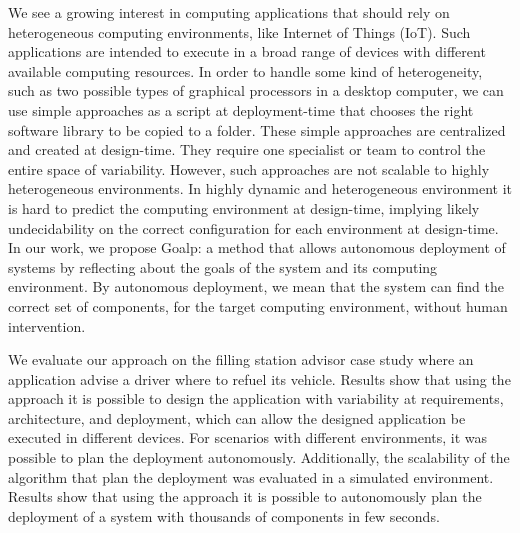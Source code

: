 We see a growing interest in computing applications that should rely on heterogeneous computing environments, like Internet of Things (IoT).
Such applications are intended to execute in a broad range of devices with different available computing resources.
In order to handle some kind of heterogeneity, such as two possible types of graphical processors in a desktop computer, we can use simple approaches as a script at deployment-time that chooses the right software library to be copied to a folder.
These simple approaches are centralized and created at design-time. They require one specialist or team to control the entire space of variability.
However, such approaches are not scalable to highly heterogeneous environments.
In highly dynamic and heterogeneous environment it is hard to predict the computing environment at design-time, implying likely undecidability on the correct configuration for each environment at design-time.
In our work, we propose Goalp: a method that allows autonomous deployment of systems by reflecting about the goals of the system and its computing environment. By autonomous deployment, we mean that the system can find the correct set of components, for the target computing environment, without human intervention.

We evaluate our approach on the filling station advisor case study where an application advise a driver where to refuel its vehicle. Results show that using the approach it is possible to design the application with variability at requirements, architecture, and deployment, which can allow the designed application be executed in different devices. For scenarios with different environments, it was possible to plan the deployment autonomously. Additionally, the scalability of the algorithm that plan the deployment was evaluated in a simulated environment. Results show that using the approach it is possible to autonomously plan the deployment of a system with thousands of components in few seconds.
